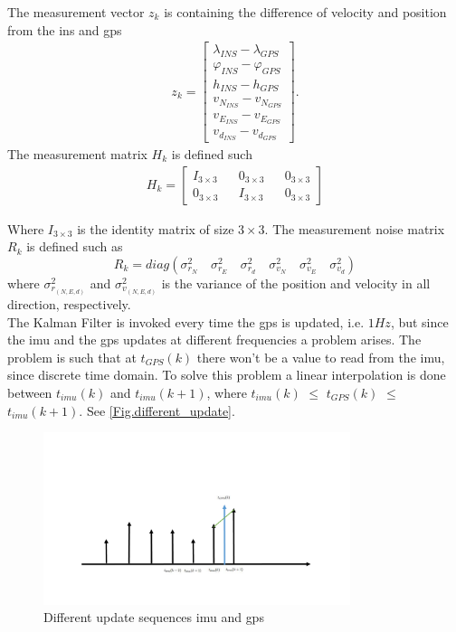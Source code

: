The measurement vector $z_k$ is containing the difference of velocity and position from the \gls{ins} and \gls{gps}
\begin{align}
z_k =
\begin{bmatrix}
\lambda_{INS} - \lambda_{GPS} \\
\varphi_{INS} - \varphi_{GPS} \\
h_{INS} - h_{GPS} \\
v_{N_{INS}} - v_{N_{GPS}} \\
v_{E_{INS}} - v_{E_{GPS}} \\
v_{d_{INS}} - v_{d_{GPS}}
\end{bmatrix}.
\end{align}
The measurement matrix $H_k$ is defined such
\begin{align}
H_k = 
\begin{bmatrix}
I_{3\times 3} && 0_{3 \times 3} && 0_{3 \times 3} \\
0_{3 \times 3} && I_{3\times 3} && 0_{3 \times 3}
\end{bmatrix}
\end{align}

Where $I_{3\times3}$ is the identity matrix of size $3\times 3$. The measurement noise matrix $R_k$ is defined such as 
\begin{equation}
R_k = diag(\sigma_{r_N}^2 \quad \sigma_{r_E}^2 \quad \sigma_{r_d}^2 \quad \sigma_{v_N}^2 \quad \sigma_{v_E}^2 \quad \sigma_{v_d}^2)
\end{equation}
where $\sigma_{r_{(N,E,d)}}^2$ and $\sigma_{v_{(N,E,d)}}^2$ is the variance of the position and velocity in all direction, respectively.\\

The Kalman Filter is invoked every time the \gls{gps} is updated, i.e. $1Hz$, but since the \gls{imu} and the \gls{gps} updates at different frequencies a problem arises. The problem is such that at $t_{GPS}(k)$ there won't be a value to read from the \gls{imu}, since discrete time domain. To solve this problem a linear interpolation is done between $t_{imu}(k)$ and $t_{imu}(k+1)$, where $t_{imu}(k)$ $\leq$ $t_{GPS}(k)$ $\leq$  $t_{imu}(k+1)$. See \autoref{Fig.different_update}.
\begin{figure}[H]
\centering
\includegraphics[width=0.8\textwidth]{Figures/linear.pdf}
\caption{Different update sequences \gls{imu} and \gls{gps}}
\label{Fig.different_update}
\end{figure}

